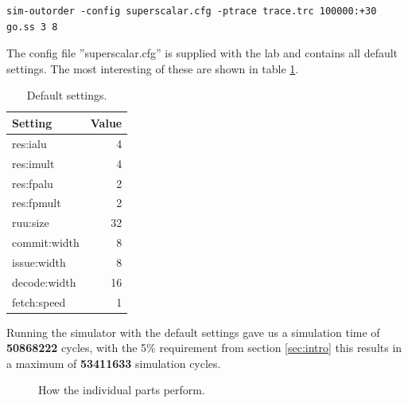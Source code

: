\documentclass[titlepage, a4paper]{article}
\begin{document}
\begin{lstlisting}[caption=Simulator command., label=sim:simcom, breaklines=true]
sim-outorder -config superscalar.cfg -ptrace trace.trc 100000:+30 go.ss 3 8
\end{lstlisting}

The config file ''superscalar.cfg'' is supplied with the lab and contains all default settings. The most interesting of these are shown in table \ref{tab:default}.

\begin{table}[H]
\centering
\caption{Default settings.}

\begin{tabular}{|l|r|}
  \hline
  \textbf{Setting} & \textbf{Value} \\ \hline
  res:ialu & 4 \\ \hline
  res:imult & 4 \\ \hline
  res:fpalu & 2 \\ \hline
  res:fpmult & 2 \\ \hline
  ruu:size & 32 \\ \hline
  commit:width & 8 \\ \hline
  issue:width & 8 \\ \hline
  decode:width & 16 \\ \hline
  fetch:speed & 1 \\ \hline
\end{tabular}

\label{tab:default}
\end{table}

Running the simulator with the default settings gave us a simulation time of \textbf{50868222} cycles, with the 5\% requirement from section \ref{sec:intro} this results in a maximum of \textbf{53411633} simulation cycles.

\begin{figure}[H]
  \centering
  \caption{How the individual parts perform.}
  \label{fig:performance}
\end{figure}
\end{document}
